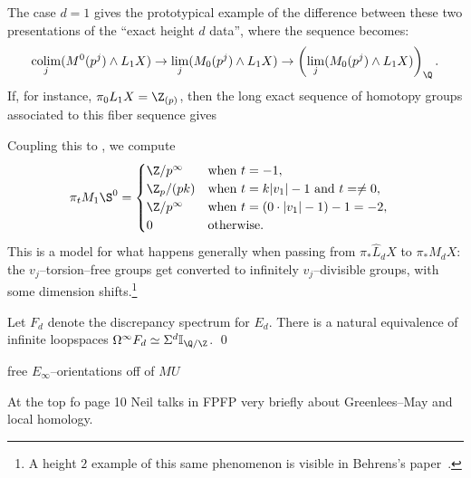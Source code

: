 \begin{remark}
The case $d = 1$ gives the prototypical example of the difference between these two presentations of the ``exact height $d$ data'', where the sequence becomes: \[\colim_j (M^0(p^j) \sm L_1 X) \to \lim_j (M_0(p^j) \sm L_1 X) \to \left( \lim_j (M_0(p^j) \sm L_1 X) \right)_{\Q}.\]  If, for instance, $\pi_0 L_1 X = \Z_{(p)}$, then the long exact sequence of homotopy groups associated to this fiber sequence gives
\begin{center}
\end{center}
Coupling this to , we compute
\begin{align*}
\pi_t M_1 \S^0 & = \begin{cases} \Z/p^\infty & \text{when $t = -1$}, \\ \Z_p / (pk) & \text{when $t = k|v_1| - 1$ and $t = \ne 0$}, \\ \Z/p^\infty & \text{when $t = (0 \cdot |v_1| - 1) - 1 = -2$}, \\ 0 & \text{otherwise}. \end{cases}
\end{align*}
This is a model for what happens generally when passing from $\pi_* \widehat L_d X$ to $\pi_* M_d X$: the $v_j$--torsion--free groups get converted to infinitely $v_j$--divisible groups, with some dimension shifts.\footnote{A height $2$ example of this same phenomenon is visible in Behrens's paper~\cite[Section 7]{BehrensRevisited}.}
\end{remark}




\begin{theorem}
Let $F_d$ denote the discrepancy spectrum for $E_d$.  There is a natural equivalence of infinite loopspaces $\Loops^\infty F_d \simeq \Susp^d \mathbb I_{\Q/\Z}$. \qed
\end{theorem}




free $E_\infty$--orientations off of $MU$



At the top fo page 10 Neil talks in FPFP very briefly about Greenlees--May and local homology.






